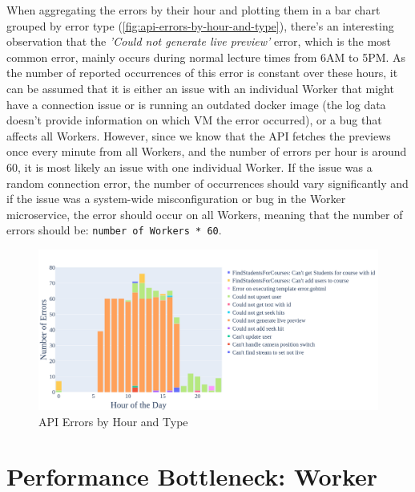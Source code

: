 When aggregating the errors by their hour and plotting them in a bar chart grouped by error type (\autoref{fig:api-errors-by-hour-and-type}), there's an interesting observation that the \textit{'Could not generate live preview'} error, which is the most common error, mainly occurs during normal lecture times from 6AM to 5PM. As the number of reported occurrences of this error is constant over these hours, it can be assumed that it is either an issue with an individual Worker that might have a connection issue or is running an outdated docker image (the log data doesn't provide information on which \ac{VM} the error occurred), or a bug that affects all Workers. However, since we know that the \ac{API} fetches the previews once every minute from all Workers, and the number of errors per hour is around 60, it is most likely an issue with one individual Worker. If the issue was a random connection error, the number of occurrences should vary significantly and if the issue was a system-wide misconfiguration or bug in the Worker microservice, the error should occur on all Workers, meaning that the number of errors should be: \texttt{number of Workers * 60}.     

\begin{figure}[htpb]
    \centering
    \includegraphics[width=\linewidth]{images/plots/api/errors_by_hour_and_type.png}
    \caption[\ac{API} Errors by Hour and Type]{\ac{API} Errors by Hour and Type}\label{fig:api-errors-by-hour-and-type}
\end{figure}


\section{Performance Bottleneck: Worker}

